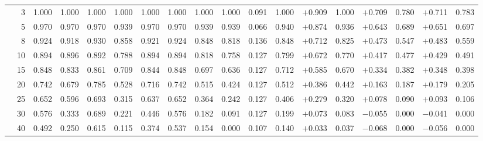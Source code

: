 \documentclass[conference]{IEEEtran}
\theoremstyle{remark}
\begin{document}
\begin{table}[ht]
{\begin{tabular}{p{2.2cm}r rrrr rr rr rr rr rr rr}
  & 3  & 1.000 & 1.000 & 1.000 & 1.000 & 1.000 & 1.000 & 1.000 & 1.000 & 0.091 & 1.000 & \cellcolor{green!15}$+$0.909 & \cellcolor{green!15}1.000 & \cellcolor{green!15}$+$0.709 & \cellcolor{green!15}0.780 & \cellcolor{green!15}$+$0.711 & \cellcolor{green!15}0.783 \\
  & 5  & 0.970 & 0.970 & 0.970 & 0.939 & 0.970 & 0.970 & 0.939 & 0.939 & 0.066 & 0.940 & \cellcolor{green!15}$+$0.874 & \cellcolor{green!15}0.936 & \cellcolor{green!15}$+$0.643 & \cellcolor{green!15}0.689 & \cellcolor{green!15}$+$0.651 & \cellcolor{green!15}0.697 \\
  & 8  & 0.924 & 0.918 & 0.930 & 0.858 & 0.921 & 0.924 & 0.848 & 0.818 & 0.136 & 0.848 & \cellcolor{green!15}$+$0.712 & \cellcolor{green!15}0.825 & \cellcolor{green!15}$+$0.473 & \cellcolor{green!15}0.547 & \cellcolor{green!15}$+$0.483 & \cellcolor{green!15}0.559 \\
  & 10 & 0.894 & 0.896 & 0.892 & 0.788 & 0.894 & 0.894 & 0.818 & 0.758 & 0.127 & 0.799 & \cellcolor{green!15}$+$0.672 & \cellcolor{green!15}0.770 & \cellcolor{green!15}$+$0.417 & \cellcolor{green!15}0.477 & \cellcolor{green!15}$+$0.429 & \cellcolor{green!15}0.491 \\
  & 15 & 0.848 & 0.833 & 0.861 & 0.709 & 0.844 & 0.848 & 0.697 & 0.636 & 0.127 & 0.712 & \cellcolor{green!15}$+$0.585 & \cellcolor{green!15}0.670 & \cellcolor{green!15}$+$0.334 & \cellcolor{green!15}0.382 & \cellcolor{green!15}$+$0.348 & \cellcolor{green!15}0.398 \\
  & 20 & 0.742 & 0.679 & 0.785 & 0.528 & 0.716 & 0.742 & 0.515 & 0.424 & 0.127 & 0.512 & \cellcolor{green!15}$+$0.386 & \cellcolor{green!15}0.442 & \cellcolor{green!15}$+$0.163 & \cellcolor{green!15}0.187 & \cellcolor{green!15}$+$0.179 & \cellcolor{green!15}0.205 \\
  & 25 & 0.652 & 0.596 & 0.693 & 0.315 & 0.637 & 0.652 & 0.364 & 0.242 & 0.127 & 0.406 & \cellcolor{green!15}$+$0.279 & \cellcolor{green!15}0.320 & \cellcolor{green!15}$+$0.078 & \cellcolor{green!15}0.090 & \cellcolor{green!15}$+$0.093 & \cellcolor{green!15}0.106 \\
  & 30 & 0.576 & 0.333 & 0.689 & 0.221 & 0.446 & 0.576 & 0.182 & 0.091 & 0.127 & 0.199 & \cellcolor{green!15}$+$0.073 & \cellcolor{green!15}0.083 & $-$0.055 & 0.000 & $-$0.041 & 0.000 \\
  & 40 & 0.492 & 0.250 & 0.615 & 0.115 & 0.374 & 0.537 & 0.154 & 0.000 & 0.107 & 0.140 & \cellcolor{green!15}$+$0.033 & \cellcolor{green!15}0.037 & $-$0.068 & 0.000 & $-$0.056 & 0.000 \\

\end{tabular}}
\end{table}
\end{document}
